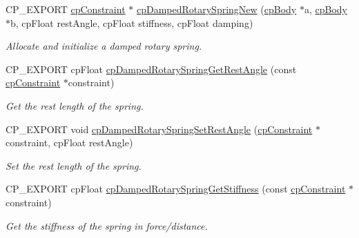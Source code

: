 \begin{DoxyCompactItemize}
C\+P\+\_\+\+E\+X\+P\+O\+RT \hyperlink{structcpConstraint}{cp\+Constraint} $\ast$ \hyperlink{group__cpDampedRotarySpring_gad825660f50d81264b56449b7349e36d6}{cp\+Damped\+Rotary\+Spring\+New} (\hyperlink{structcpBody}{cp\+Body} $\ast$a, \hyperlink{structcpBody}{cp\+Body} $\ast$b, cp\+Float rest\+Angle, cp\+Float stiffness, cp\+Float damping)
\begin{DoxyCompactList}\small\item\em Allocate and initialize a damped rotary spring. \end{DoxyCompactList}\item 
\mbox{\label{group__cpDampedRotarySpring_gad64b790743acc1ee723df5c057821a85}} 
C\+P\+\_\+\+E\+X\+P\+O\+RT cp\+Float \hyperlink{group__cpDampedRotarySpring_gad64b790743acc1ee723df5c057821a85}{cp\+Damped\+Rotary\+Spring\+Get\+Rest\+Angle} (const \hyperlink{structcpConstraint}{cp\+Constraint} $\ast$constraint)
\begin{DoxyCompactList}\small\item\em Get the rest length of the spring. \end{DoxyCompactList}\item 
\mbox{\label{group__cpDampedRotarySpring_gaef8aeefa0f56c4bc8c1b1b526d31bbc5}} 
C\+P\+\_\+\+E\+X\+P\+O\+RT void \hyperlink{group__cpDampedRotarySpring_gaef8aeefa0f56c4bc8c1b1b526d31bbc5}{cp\+Damped\+Rotary\+Spring\+Set\+Rest\+Angle} (\hyperlink{structcpConstraint}{cp\+Constraint} $\ast$constraint, cp\+Float rest\+Angle)
\begin{DoxyCompactList}\small\item\em Set the rest length of the spring. \end{DoxyCompactList}\item 
\mbox{\label{group__cpDampedRotarySpring_ga0bdc853bacf56c54c246daa0fb40be62}} 
C\+P\+\_\+\+E\+X\+P\+O\+RT cp\+Float \hyperlink{group__cpDampedRotarySpring_ga0bdc853bacf56c54c246daa0fb40be62}{cp\+Damped\+Rotary\+Spring\+Get\+Stiffness} (const \hyperlink{structcpConstraint}{cp\+Constraint} $\ast$constraint)
\begin{DoxyCompactList}\small\item\em Get the stiffness of the spring in force/distance. \end{DoxyCompactList}\item 
\mbox{\label{group__cpDampedRotarySpring_ga2da549aff945710a181b704b3a57a6f3}} 

\end{DoxyCompactItemize}
